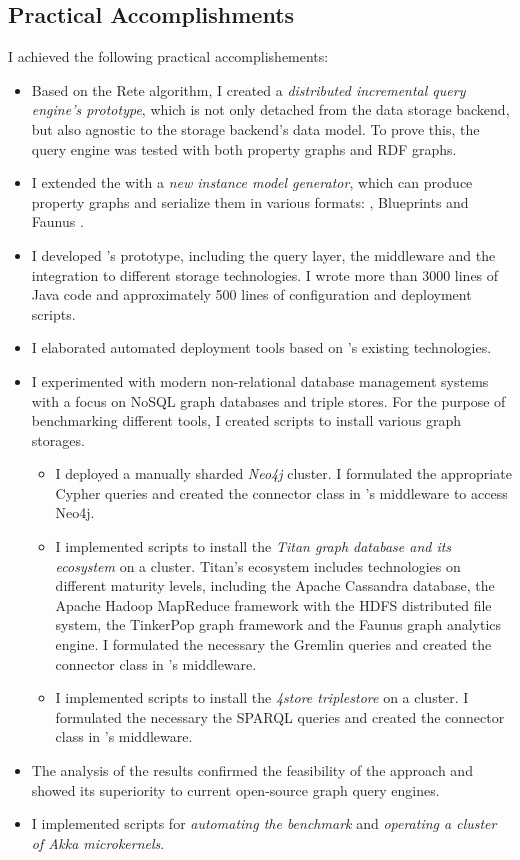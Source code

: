 \subsection{Practical Accomplishments}

I achieved the following practical accomplishements:

\begin{itemize}
  \item Based on the Rete algorithm, I created a \emph{distributed incremental query engine's prototype}, which is not only detached from the data storage backend, but also agnostic to the storage backend's data model. To prove this, the query engine was tested with both property graphs and RDF graphs.
  \item I extended the \tb{} with a \emph{new instance model generator}, which can produce property graphs and serialize them in various formats: \graphml{}, Blueprints \graphson{} and Faunus \graphson{}.
  \item I developed \iqd{}'s prototype, including the query layer, the middleware and the integration to different storage technologies. I wrote more than 3000 lines of Java code and approximately 500 lines of configuration and deployment scripts.
  \item I elaborated automated deployment tools based on \eiq{}'s existing technologies.
  \item I experimented with modern non-relational database management systems with a focus on NoSQL graph databases and triple stores. For the purpose of benchmarking different tools, I created scripts to install various graph storages. 
  \begin{itemize}
    \item I deployed a manually sharded \emph{Neo4j} cluster. I formulated the appropriate Cypher queries and created the connector class in \iqd{}'s middleware to access Neo4j.
    \item I implemented scripts to install the \emph{Titan graph database and its ecosystem} on a cluster. Titan's ecosystem includes technologies on different maturity levels, including the Apache Cassandra database, the Apache Hadoop MapReduce framework with the HDFS distributed file system, the TinkerPop graph framework and the Faunus graph analytics engine. I formulated the necessary the Gremlin queries and created the connector class in \iqd{}'s middleware.
    \item I implemented scripts to install the \emph{4store triplestore} on a cluster. I formulated the necessary the SPARQL queries and created the connector class in \iqd{}'s middleware. 
  \end{itemize}
  \item The analysis of the results confirmed the feasibility of the approach and showed its superiority to current open-source graph query engines.
  \item I implemented scripts for \emph{automating the benchmark} and \emph{operating a cluster of Akka microkernels}.
\end{itemize}

